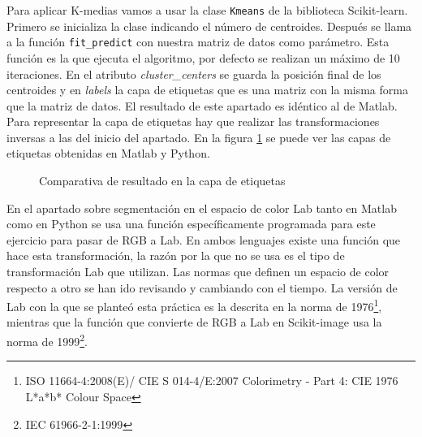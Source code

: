 \documentclass[a4paper,12pt]{report}
\begin{document}
Para aplicar K-medias vamos a usar la clase \texttt{Kmeans} de la biblioteca Scikit-learn. Primero se inicializa la clase indicando el número de centroides. Después se llama a la función \texttt{fit\_predict} con nuestra matriz de datos como parámetro. Esta función es la que ejecuta el algoritmo, por defecto se realizan un máximo de 10 iteraciones. En el atributo \emph{cluster\_centers} se guarda la posición final de los centroides y en \emph{labels} la capa de etiquetas que es una matriz con la misma forma que la matriz de datos. El resultado de este apartado es idéntico al de Matlab. \\

Para representar la capa de etiquetas hay que realizar las transformaciones inversas a las del inicio del apartado. En la figura \ref{comprgb} se puede ver las capas de etiquetas obtenidas en Matlab y Python. \\

\begin{figure}[!tbp]
  \centering
  \hfill
  \caption{Comparativa de resultado en la capa de etiquetas}
  \label{comprgb}
\end{figure}

En el apartado sobre segmentación en el espacio de color Lab tanto en Matlab como en Python se usa una función específicamente programada para este ejercicio para pasar de RGB a Lab. En ambos lenguajes existe una función que hace esta transformación, la razón por la que no se usa es el tipo de transformación Lab que utilizan. Las normas que definen un espacio de color respecto a otro se han ido revisando y cambiando con el tiempo. La versión de Lab con la que se planteó esta práctica es la descrita en la norma de 1976\footnote{ISO 11664-4:2008(E)/ CIE S 014-4/E:2007 Colorimetry - Part 4: CIE 1976 L*a*b* Colour Space}, mientras que la función que convierte de RGB a Lab en Scikit-image usa la norma de 1999\footnote{IEC 61966-2-1:1999}.\\
\end{document}
